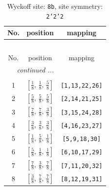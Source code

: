 \documentclass[fleqn,8pt]{jsarticle}
\begin{document}
\begin{longtable}{ccc}
\caption{Wyckoff site: {\tt 8b}, site symmetry: {\tt 2'2'2}}
 \\
 \hline \hline
No. & position & mapping \\ \hline \endfirsthead

\multicolumn{2}{l}{\tablename\ \thetable{}} \\
 \hline \hline
No. & position & mapping \\ \hline \endhead

 \hline \hline
\multicolumn{2}{r}{\footnotesize\it continued ...} \\ \endfoot

 \hline \hline
\multicolumn{2}{r}{} \\ \endlastfoot

1 & $\left[ \frac{1}{8},\, \frac{1}{8},\, \frac{5}{8} \right]$ & {\tt [1,13,22,26]} \\ \hline
2 & $\left[ \frac{5}{8},\, \frac{5}{8},\, \frac{5}{8} \right]$ & {\tt [2,14,21,25]} \\ \hline
3 & $\left[ \frac{7}{8},\, \frac{7}{8},\, \frac{3}{8} \right]$ & {\tt [3,15,24,28]} \\ \hline
4 & $\left[ \frac{3}{8},\, \frac{3}{8},\, \frac{3}{8} \right]$ & {\tt [4,16,23,27]} \\ \hline
5 & $\left[ \frac{1}{8},\, \frac{5}{8},\, \frac{1}{8} \right]$ & {\tt [5,9,18,30]} \\ \hline
6 & $\left[ \frac{5}{8},\, \frac{1}{8},\, \frac{1}{8} \right]$ & {\tt [6,10,17,29]} \\ \hline
7 & $\left[ \frac{7}{8},\, \frac{3}{8},\, \frac{7}{8} \right]$ & {\tt [7,11,20,32]} \\ \hline
8 & $\left[ \frac{3}{8},\, \frac{7}{8},\, \frac{7}{8} \right]$ & {\tt [8,12,19,31]} \\
\end{longtable}
\renewcommand{\arraystretch}{1.2}
\end{document}
